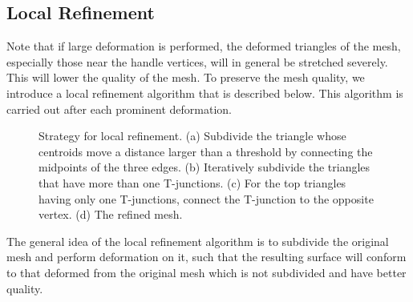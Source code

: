 \subsection{Local Refinement}\label{ch3:sec:alg:refine}

Note that if large deformation is performed, the deformed triangles of the mesh, especially those near the handle vertices, will in general be stretched severely. This will lower the quality of the mesh. To preserve the mesh quality, we introduce a local refinement algorithm that is described below. This algorithm is carried out after each prominent deformation.

\begin{figure} [htbp]
  \centering
  \caption{Strategy for local refinement. (a) Subdivide the triangle whose centroids move a distance larger than a threshold by connecting the midpoints of the three edges. (b) Iteratively subdivide the triangles that have more than one T-junctions. (c) For the top triangles having only one T-junctions, connect the T-junction to the opposite vertex. (d) The refined mesh.}
  \label{fig:allocalrefine} %
\end{figure}

The general idea of the local refinement algorithm is to subdivide the original mesh and perform deformation on it, such that the resulting surface will conform to that deformed from the original mesh which is not subdivided and have better quality.

